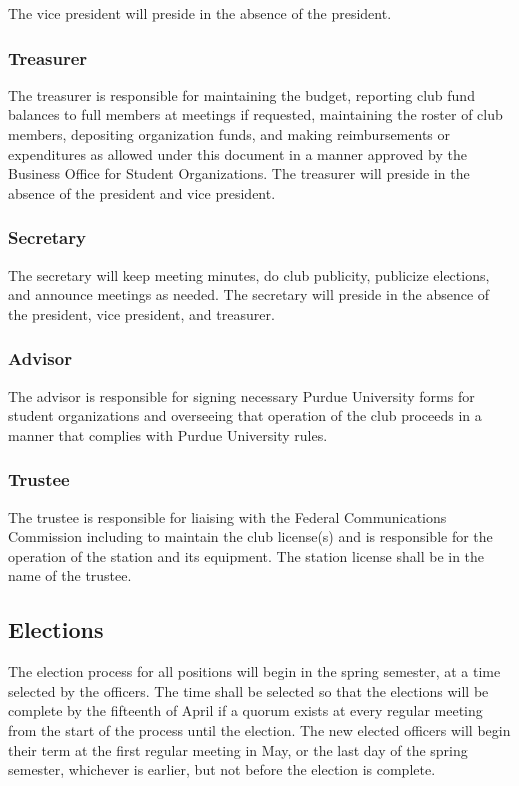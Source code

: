 \documentclass{article}
\begin{document}
The vice president will preside in the absence of the president.

\subsubsection{Treasurer}

The treasurer is responsible for maintaining the budget, reporting club fund
balances to full members at meetings if requested, maintaining the roster of
club members, depositing organization funds, and making reimbursements or
expenditures as allowed under this document in a manner approved by the Business
Office for Student Organizations. The treasurer will preside in the absence of
the president and vice president.

\subsubsection{Secretary}

The secretary will keep meeting minutes, do club publicity, publicize elections,
and announce meetings as needed. The secretary will preside in the absence of
the president, vice president, and treasurer.

\subsubsection{Advisor}

The advisor is responsible for signing necessary Purdue University forms for
student organizations and overseeing that operation of the club proceeds in a
manner that complies with Purdue University rules.

\subsubsection{Trustee}

The trustee is responsible for liaising with the Federal Communications
Commission including to maintain the club license(s) and is responsible for the
operation of the station and its equipment. The station license shall be in the
name of the trustee.

\subsection{Elections}

The election process for all positions will begin in the spring semester, at a
time selected by the officers. The time shall be selected so that the elections
will be complete by the fifteenth of April if a quorum exists at every regular
meeting from the start of the process until the election. The new elected
officers will begin their term at the first regular meeting in May, or the last
day of the spring semester, whichever is earlier, but not before the election is
complete.
\end{document}
